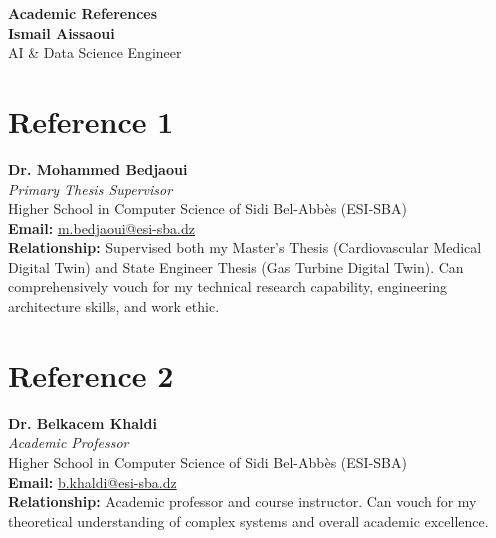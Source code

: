 \documentclass[11pt, a4paper]{article}
\begin{document}
\begin{center}
    \LARGE \textbf{Academic References} \\
    \vspace{0.2cm}
    \large \textbf{Ismail Aissaoui} \\
    \vspace{0.1cm}
    \normalsize AI \& Data Science Engineer \\
\end{center}

\vspace{1cm}

\section*{Reference 1}
\textbf{Dr. Mohammed Bedjaoui} \\
\textit{Primary Thesis Supervisor} \\
Higher School in Computer Science of Sidi Bel-Abbès (ESI-SBA) \\
\textbf{Email:} \href{mailto:m.bedjaoui@esi-sba.dz}{m.bedjaoui@esi-sba.dz} \\
\textbf{Relationship:} Supervised both my Master's Thesis (Cardiovascular Medical Digital Twin) and State Engineer Thesis (Gas Turbine Digital Twin). Can comprehensively vouch for my technical research capability, engineering architecture skills, and work ethic.

\vspace{1cm}

\section*{Reference 2}
\textbf{Dr. Belkacem Khaldi} \\
\textit{Academic Professor} \\
Higher School in Computer Science of Sidi Bel-Abbès (ESI-SBA) \\
\textbf{Email:} \href{mailto:b.khaldi@esi-sba.dz}{b.khaldi@esi-sba.dz} \\
\textbf{Relationship:} Academic professor and course instructor. Can vouch for my theoretical understanding of complex systems and overall academic excellence.
\end{document}
